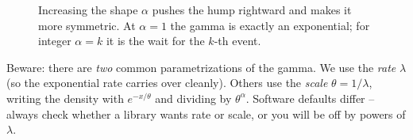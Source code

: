 \begin{figure}[H]
\centering
{}
\caption{Increasing the shape $\alpha$ pushes the hump rightward and makes it
more symmetric. At $\alpha=1$ the gamma is exactly an exponential; for integer
$\alpha=k$ it is the wait for the $k$-th event.}
\label{ch11:fig-gamma}
\end{figure}
\begin{marginnotebox}
Beware: there are \emph{two} common parametrizations of the gamma. We use the
\emph{rate} $\lambda$ (so the exponential rate carries over cleanly). Others use
the \emph{scale} $\theta = 1/\lambda$, writing the density with $e^{-x/\theta}$
and dividing by $\theta^{\alpha}$. Software defaults differ -- always check
whether a library wants rate or scale, or you will be off by powers of
$\lambda$.
\end{marginnotebox}
